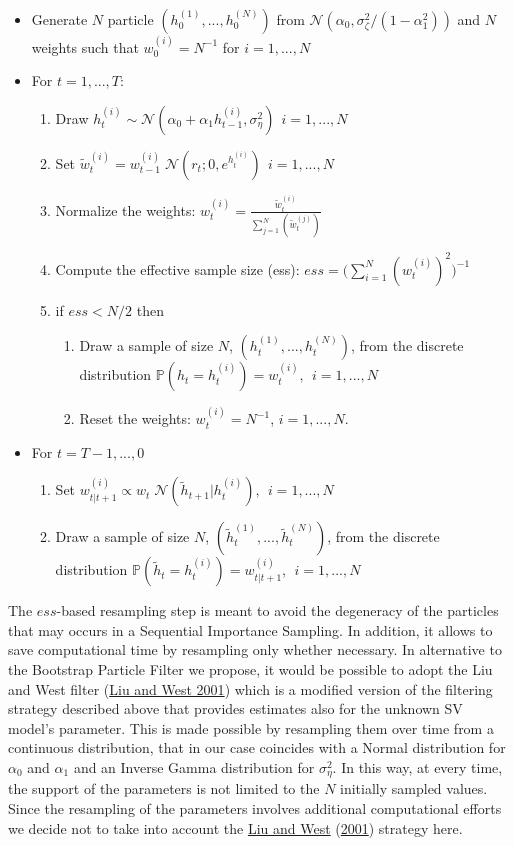 \documentclass[
  12pt,
]{book}
\theoremstyle{break}
\theoremstyle{nonumberplain}
\begin{document}
\begin{itemize}
\item Generate $N$ particle $(h_{0}^{(1)},...,h_{0}^{(N)})$ from $\mathcal{N}(\alpha_{0},\sigma_{\zeta}^{2}/(1-\alpha_{1}^{2}))$ and $N$ weights such that $w_{0}^{(i)}=N^{-1}$ for $i=1,...,N$
\item For $t=1,...,T$:
\begin{enumerate}
\item Draw $h_{t}^{(i)} \sim \mathcal{N}(\alpha_0+\alpha_1 h_{t-1}^{(i)},\sigma^2_\eta) \ \ i=1,...,N$
\item Set $\tilde{w}_{t}^{(i)} = w_{t-1}^{(i)}\;\mathcal{N}(r_{t};0,e^{h^{(i)}_{t}}) \ \ i=1,...,N$
\item Normalize the weights: $w_{t}^{(i)}=\frac{\tilde{w}_{t}^{(i)}}{\sum_{j=1}^{N}(\tilde{w}_{t}^{(j)})}$
\item Compute the effective sample size (ess): $ess=\Bigg(\sum_{i=1}^{N}(w_{t}^{(i)})^{2}\Bigg)^{-1}$
\item if $ess<N/2$ then
\begin{enumerate}
\item Draw a sample of size $N$, $(h_{t}^{(1)},...,h_{t}^{(N)})$, from the discrete distribution $\mathbb{P}(h_{t}=h_{t}^{(i)})=w_{t}^{(i)},\ \ i=1,...,N$
\item Reset the weights: $w_{t}^{(i)}=N^{-1}$, $i=1,...,N$.
\end{enumerate}
\end{enumerate}
\item For $t=T-1,...,0$
\begin{enumerate}
\item Set $w_{t|t+1}^{(i)}\propto w_{t}\;\mathcal{N}(\tilde{h}_{t+1}|h_{t}^{(i)}), \ \ i=1,...,N$
\item Draw a sample of size $N$, $(\tilde{h}_{t}^{(1)},...,\tilde{h}_{t}^{(N)})$, from the discrete distribution $\mathbb{P}(\tilde{h}_{t}=h_{t}^{(i)})=w_{t|t+1}^{(i)},\ \ i=1,...,N$
\end{enumerate}
\end{itemize}

The \(ess\)-based resampling step is meant to avoid the degeneracy of
the particles that may occurs in a Sequential Importance Sampling. In
addition, it allows to save computational time by resampling only
whether necessary. In alternative to the Bootstrap Particle Filter we
propose, it would be possible to adopt the Liu and West filter
(\protect\hyperlink{ref-LW_2001}{Liu and West 2001}) which is a modified
version of the filtering strategy described above that provides
estimates also for the unknown SV model's parameter. This is made
possible by resampling them over time from a continuous distribution,
that in our case coincides with a Normal distribution for \(\alpha_0\)
and \(\alpha_1\) and an Inverse Gamma distribution for
\(\sigma_{\eta}^{2}\). In this way, at every time, the support of the
parameters is not limited to the \(N\) initially sampled values. Since
the resampling of the parameters involves additional computational
efforts we decide not to take into account the
\protect\hyperlink{ref-LW_2001}{Liu and West}
(\protect\hyperlink{ref-LW_2001}{2001}) strategy here.
\end{document}
